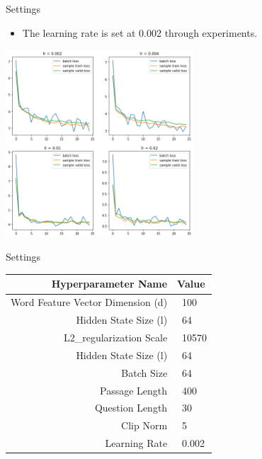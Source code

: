 \documentclass{beamer}
\begin{document}
\begin{frame}{Settings}
    \begin{itemize}
        \item The learning rate is set at 0.002 through experiments.
    \end{itemize}
    \begin{center}
        \includegraphics[width=7cm, height=7cm]{figures/lr.png}
    \end{center}
\end{frame}

\begin{frame}{Settings}
    \begin{table}[htbp]\centering

      \begin{tabular}{|r|l|} \hline
        Hyperparameter Name& Value \\ \hline\hline
        Word Feature Vector Dimension (d) & \ 100 \\
        Hidden State Size (l) & \ 64 \\
        L2\_regularization Scale & \ 10570\\
        Hidden State Size (l) & \ 64\\
        Batch Size & \ 64\\
        Passage Length & \ 400\\
        Question Length & \ 30\\
        Clip Norm & \ 5\\
        Learning Rate & \ 0.002 \\ \hline
      \end{tabular}
    \end{table}
\end{frame}
\end{document}
